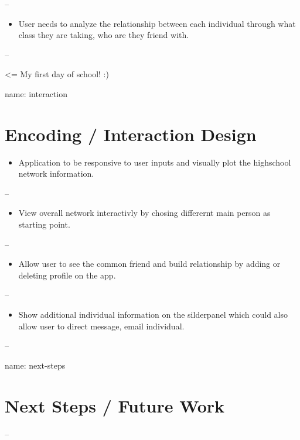 \documentclass[]{article}
\providecommand{\tightlist}{%
  \setlength{\itemsep}{0pt}\setlength{\parskip}{0pt}}
\begin{document}
--

\begin{itemize}
\tightlist
\item
  User needs to analyze the relationship between each individual through
  what class they are taking, who are they friend with.
\end{itemize}

--

 \textless{}= My first day of school! :)

name: interaction

\section{Encoding / Interaction
Design}\label{encoding-interaction-design}

\begin{itemize}
\tightlist
\item
  Application to be responsive to user inputs and visually plot the
  highschool network information.
\end{itemize}

--

\begin{itemize}
\tightlist
\item
  View overall network interactivly by chosing differernt main person as
  starting point.
\end{itemize}

--

\begin{itemize}
\tightlist
\item
  Allow user to see the common friend and build relationship by adding
  or deleting profile on the app.
\end{itemize}

--

\begin{itemize}
\tightlist
\item
  Show additional individual information on the silderpanel which could
  also allow user to direct message, email individual.
\end{itemize}

--

name: next-steps

\section{Next Steps / Future Work}\label{next-steps-future-work}

--
\end{document}
